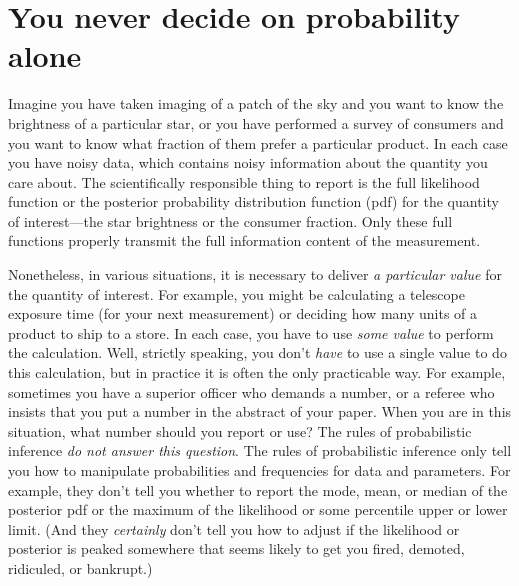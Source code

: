 \documentclass[12pt,twoside,pdftex]{article}
\begin{document}
\section{You never decide on probability alone}

Imagine you have taken imaging of a patch of the sky and you want to
know the brightness of a particular star, or you have performed a
survey of consumers and you want to know what fraction of them prefer
a particular product.  In each case you have noisy data, which
contains noisy information about the quantity you care about.  The
scientifically responsible thing to report is the full likelihood
function or the posterior probability distribution
function (pdf) for the
quantity of interest---the star brightness or the consumer fraction.
Only these full functions properly transmit the full information
content of the measurement.

Nonetheless, in various situations, it is necessary to deliver \emph{a
  particular value} for the quantity of interest.  For example, you
might be calculating a telescope exposure time (for your next
measurement) or deciding how many units of a product to ship to a
store.  In each case, you have to use \emph{some value} to perform the
calculation.  Well, strictly speaking, you don't \emph{have} to use a
single value to do this calculation, but in practice it is often the
only practicable way.  For example, sometimes you have a superior
officer who demands a number, or a referee who insists that you put a
number in the abstract of your paper.  When you are in this situation,
what number should you report or use?  The rules of probabilistic
inference \emph{do not answer this question}.  The rules of
probabilistic inference only tell you how to manipulate probabilities
and frequencies for data and parameters.  For example, they don't tell
you whether to report the mode, mean, or median of the posterior pdf
or the maximum of the likelihood or some percentile upper or lower
limit.  (And they \emph{certainly} don't tell you how to adjust if the
likelihood or posterior is peaked somewhere that seems likely to get
you fired, demoted, ridiculed, or bankrupt.)
\end{document}
